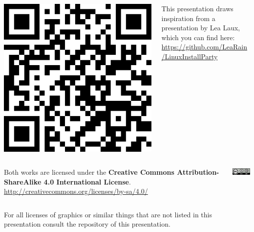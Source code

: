 \begin{frame}
	\begin{columns}%
		\begin{column}{\selfrefrightcolumn}%
			\includegraphics[width=\linewidth]{../graphics/lea_laux_presentation_qr_code.png}%
		\end{column}%
		\hfill%
		\begin{column}{\selfrefleftcolumn}%
			This presentation draws inspiration from a presentation by Lea Laux, which you can find here:\\[.2\baselineskip]%
			\url{https://github.com/LeaRain/LinuxInstallParty}%
		\end{column}%
	\end{columns}%
	
	\vfill%
	
	\begin{columns}%
		\begin{column}{\selfrefleftcolumn}%
			Both works are licensed under the \textbf{Creative Commons Attribution-ShareAlike 4.0 International License}.\\[.2\baselineskip]%
			\url{http://creativecommons.org/licenses/by-sa/4.0/}%
		\end{column}%
		\hfill%
		\begin{column}{\selfrefrightcolumn}%
			\centering\includegraphics[width=1.5cm]{../graphics/cc-by-sa.png}%
		\end{column}%
	\end{columns}%

	\vfill%
	
	\begin{columns}
		\begin{column}{\linewidth}
			For all licenses of graphics or similar things that are not listed in this presentation consult the repository of this presentation.
		\end{column}
		\hfill%
	\end{columns}
\end{frame}
